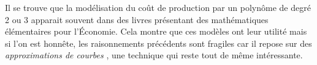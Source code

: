 Il se trouve que la modélisation du coût de production par un polynôme de degré 2 ou 3 apparait souvent dans des livres présentant des mathématiques élémentaires pour l'Économie. Cela montre que ces modèles ont leur utilité mais si l'on est honnête, les raisonnements précédents sont fragiles car il repose sur des \emph{\og approximations de courbes \fg} , une technique qui reste tout de même intéressante.